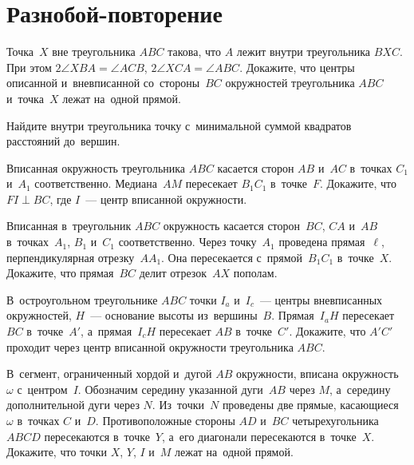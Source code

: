 
\section*{Разнобой-повторение}


\begin{problems}

\item
Точка~$X$ вне треугольника $ABC$ такова, что $A$ лежит внутри
треугольника $BXC$.
При этом $2 \angle XBA = \angle ACB$, $2 \angle XCA = \angle ABC$.
Докажите, что центры описанной и~вневписанной со~стороны~$BC$ окружностей
треугольника $ABC$ и~точка~$X$ лежат на~одной прямой.

\item
Найдите внутри треугольника точку с~минимальной суммой квадратов расстояний
до~вершин.

\item
Вписанная окружность треугольника $ABC$ касается сторон $AB$ и~$AC$
в~точках $C_1$ и~$A_1$ соответственно.
Медиана~$AM$ пересекает $B_1 C_1$ в~точке~$F$.
Докажите, что $FI \perp BC$, где $I$~--- центр вписанной окружности.

\item
Вписанная в~треугольник $ABC$ окружность касается сторон~$BC$, $CA$ и~$AB$
в~точках~$A_1$, $B_1$ и~$C_1$ соответственно.
Через точку~$A_1$ проведена прямая~$\ell$, перпендикулярная отрезку~$A A_1$.
Она пересекается с~прямой~$B_1 C_1$ в~точке~$X$.
Докажите, что прямая~$BC$ делит отрезок~$AX$ пополам.

\item
В~остроугольном треугольнике $ABC$ точки $I_{a}$ и~$I_{c}$~--- центры
вневписанных окружностей, $H$~--- основание высоты из~вершины~$B$.
Прямая~$I_{a} H$ пересекает $BC$ в~точке~$A'$, а~прямая~$I_{c} H$ пересекает
$AB$ в~точке~$C'$.
Докажите, что $A'C'$ проходит через центр вписанной окружности
треугольника $ABC$.

\item
В~сегмент, ограниченный хордой и~дугой $AB$ окружности, вписана окружность
$\omega$ с~центром~$I$.
Обозначим середину указанной дуги~$AB$ через $M$, а~середину дополнительной
дуги через $N$.
Из~точки~$N$ проведены две прямые, касающиеся $\omega$ в~точках $C$ и~$D$.
Противоположные стороны $AD$ и~$BC$ четырехугольника $ABCD$ пересекаются
в~точке~$Y$, а~его диагонали пересекаются в~точке~$X$.
Докажите, что точки $X$, $Y$, $I$ и~$M$ лежат на~одной прямой.


\end{problems}
